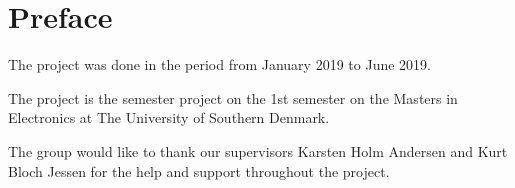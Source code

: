 \section{Preface}
The project was done in the period from January 2019 to June 2019.

The project is the semester project on the 1st semester on the Masters in Electronics at The University of Southern Denmark.

The group would like to thank our supervisors Karsten Holm Andersen and Kurt Bloch Jessen for the help and support throughout the project. 